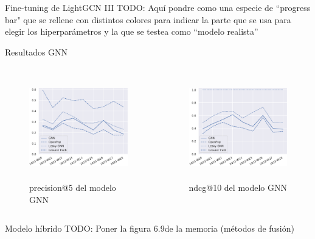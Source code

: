 \begin{frame}{Fine-tuning de LightGCN III}
    TODO: Aquí pondre como una especie de ``progress bar" que se rellene con distintos colores para indicar la parte que se usa para elegir los hiperparámetros y la que se testea como ``modelo realista''
\end{frame}

\begin{frame}{Resultados GNN}
\begin{columns}
\begin{figure}
    \centering
    \includegraphics[height=45mm]{./images/graphs/09_gnn_results_precision_5_leaky.pdf}
    \caption{precision@5 del modelo GNN}
\end{figure}
\begin{figure}
    \centering
    \includegraphics[height=45mm]{./images/graphs/09_gnn_results_ndcg_10_leaky.pdf}
    \caption{ndcg@10 del modelo GNN}
\end{figure}
\end{columns}
\end{frame}

\begin{frame}{Modelo híbrido}
    TODO: Poner la figura 6.9de la memoria (métodos de fusión)
\end{frame}